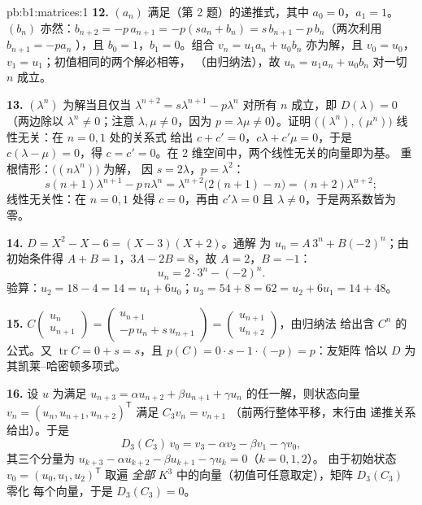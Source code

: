 \begin{solution}{pb:b1:matrices:1}
\textbf{12.} $(a_n)$ 满足（第 2 题）的递推式，其中 $a_0
= 0$，$a_1 = 1$。$(b_n)$ 亦然：$b_{n+2} = -p\,a_{n+1} =
-p(s a_n + b_n) = s\,b_{n+1} - p\,b_n$（两次利用 $b_{n+1} = -pa_n$
），且 $b_0 = 1$，$b_1 = 0$。组合 $v_n =
u_1 a_n + u_0 b_n$ 亦为解，且 $v_0 = u_0$，$v_1 =
u_1$；初值相同的两个解必相等，
（由归纳法），故 $u_n = u_1 a_n + u_0 b_n$ 对一切 $n$ 成立。

\textbf{13.} $(\lambda^n)$ 为解当且仅当 $\lambda^{n+2} =
s\lambda^{n+1} - p\lambda^n$ 对所有 $n$ 成立，即 $D(\lambda) = 0$
（两边除以 $\lambda^n \neq 0$；注意 $\lambda, \mu \neq
0$，因为 $p = \lambda\mu \neq 0$）。证明
$\bigl((\lambda^n), (\mu^n)\bigr)$ 线性无关：在 $n = 0, 1$ 处的关系式
给出 $c + c' = 0$，$c\lambda + c'\mu = 0$，于是 $c(\lambda - \mu)
= 0$，得 $c = c' = 0$。在 $2$ 维空间中，两个线性无关的向量即为基。
重根情形：$\bigl((n\lambda^n)\bigr)$ 为解，
因 $s = 2\lambda$，$p = \lambda^2$：
\[
s(n+1)\lambda^{n+1} - p\,n\lambda^n
= \lambda^{n+2}\bigl(2(n+1) - n\bigr) = (n+2)\lambda^{n+2} ;
\]
线性无关性：在 $n = 0, 1$ 处得 $c = 0$，再由 $c'\lambda = 0$
且 $\lambda \neq 0$，于是两系数皆为零。

\textbf{14.} $D = X^2 - X - 6 = (X - 3)(X + 2)$。通解
为 $u_n = A\,3^n + B(-2)^n$；由初始条件得
$A + B = 1$，$3A - 2B = 8$，故 $A = 2$，$B = -1$：
\[
u_n = 2\cdot 3^n - (-2)^n .
\]
验算：$u_2 = 18 - 4 = 14 = u_1 + 6u_0$；$u_3 = 54 + 8 = 62 =
u_2 + 6u_1 = 14 + 48$。

\textbf{15.} $C\begin{pmatrix} u_n\\ u_{n+1}\end{pmatrix} =
\begin{pmatrix} u_{n+1}\\ -p\,u_n + s\,u_{n+1}\end{pmatrix} =
\begin{pmatrix} u_{n+1}\\ u_{n+2}\end{pmatrix}$，由归纳法
给出含 $C^n$ 的公式。又 $\operatorname{tr} C = 0
+ s = s$，且 $p(C) = 0\cdot s - 1\cdot(-p) = p$：友矩阵
恰以 $D$ 为其凯莱--哈密顿多项式。

\textbf{16.} 设 $u$ 为满足 $u_{n+3} = \alpha u_{n+2} +
\beta u_{n+1} + \gamma u_n$ 的任一解，则状态向量 $v_n = (u_n,
u_{n+1}, u_{n+2})^{\mathsf T}$ 满足 $C_3 v_n = v_{n+1}$
（前两行整体平移，末行由
递推关系给出）。于是
\[
D_3(C_3)\,v_0 = v_3 - \alpha v_2 - \beta v_1 - \gamma v_0 ,
\]
其三个分量为 $u_{k+3} - \alpha u_{k+2} - \beta
u_{k+1} - \gamma u_k = 0$（$k = 0, 1, 2$）。
由于初始状态 $v_0 = (u_0, u_1, u_2)^{\mathsf T}$ 取遍 \emph{全部}
$K^3$ 中的向量（初值可任意取定），矩阵 $D_3(C_3)$ 零化
每个向量，于是 $D_3(C_3) = 0$。


\end{solution}
